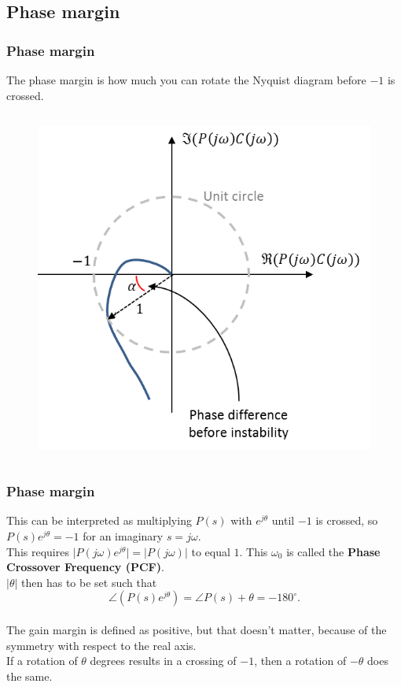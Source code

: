 \subsection{Phase margin}

\begin{frame}
	\frametitle{Phase margin}
	The phase margin is how much you can rotate the Nyquist diagram before $-1$ is crossed.
	\vspace{-4ex}
	\begin{columns}
		
		\begin{figure}
			\includegraphics[width=0.6\linewidth]{phase_margin}
		\end{figure}
	\end{columns}
\end{frame}

\begin{frame}
	\frametitle{Phase margin}
	This can be interpreted as multiplying $P(s)$ with $e^{j\theta}$ until $-1$ is crossed, so $P(s)e^{j\theta}=-1$ for an imaginary $s=j\omega$.\\
	\medskip
	This requires $\big|P(j\omega)e^{j\theta}\big|=\big|P(j\omega)\big|$ to equal $1$. This $\omega_0$ is called the \textbf{Phase Crossover Frequency (PCF)}.\\
	$\big|\theta\big|$ then has to be set such that $$\angle(P(s)e^{j\theta})=\angle P(s) + \theta = -180^{\circ}.$$\\
	The gain margin is defined as positive, but that doesn't matter, because of the symmetry with respect to the real axis.\\
	If a rotation of $\theta$ degrees results in a crossing of $-1$, then a rotation of $-\theta$ does the same.
\end{frame}

